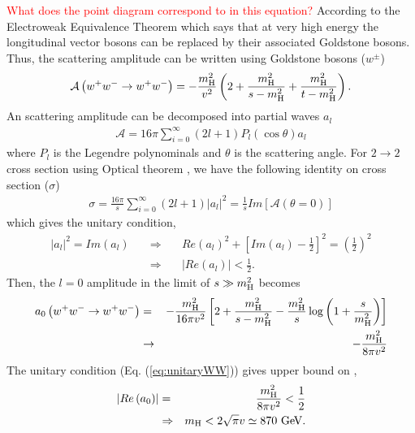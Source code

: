 \textcolor{red}{What does the point diagram correspond to in this equation?}  
According to the Electroweak Equivalence Theorem \cite{31-33} which says 
that at very high energy the longitudinal vector bosons can be replaced by 
their associated Goldstone bosons. Thus, the scattering amplitude can be written 
using Goldstone bosons ($w^\pm$)
\begin{eqnarray} 
\mathcal{A}\left( w^+w^- \to w^+w^- \right) 
= 
- \frac{m_{\mathrm{H}}^2}{v^2}  \left( 2 + \frac{m_{\mathrm{H}}^2}{s - m_{\mathrm{H}}^2} + \frac{m_{\mathrm{H}}^2}{t - m_{\mathrm{H}}^2} \right). 
\end{eqnarray} 
An scattering amplitude can be decomposed into partial waves $a_l$
\begin{eqnarray} 
\mathcal{A} = 16 \pi \sum_{i=0}^\infty 
              \left( 2l+1 \right) P_l \left( \cos \theta \right) a_l
\end{eqnarray} 
where $P_l$ is the Legendre polynominals and $\theta$ is the scattering angle.
For $2 \to 2$ cross section using Optical theorem \cite{optical}, we have the 
following identity on cross section ($\sigma$) 
\begin{eqnarray} 
\sigma 
= \frac{16 \pi}{s} \sum_{i=0}^\infty  \left( 2l+1 \right) \left| a_l \right|^2 
= \frac{1}{s} Im \left[ \mathcal{A} \left(\theta = 0 \right)  \right]
\end{eqnarray} 
which gives the unitary condition, 
\begin{eqnarray} 
\left| a_l \right|^2 = Im \left( a_l \right) 
\quad &\Rightarrow& \quad  
Re\left( a_l \right)^2 
+ \left[ Im\left( a_l \right)  - \frac{1}{2} \right]^2 
= \left( \frac{1}{2} \right)^2 \\
\label{eq:unitaryWW}
\quad &\Rightarrow& \quad 
\left| Re \left( a_l \right) \right| < \frac{1}{2}.   
\end{eqnarray} 
Then, the $l=0$ amplitude in the limit of $ s \gg m_{\mathrm{H}}^2$ becomes  
\begin{eqnarray} 
a_0\left( w^+w^- \to w^+w^- \right)  
&=&  
- \frac{m_{\mathrm{H}}^2}{16\pi v^2}  
\left[ 2 + \frac{m_{\mathrm{H}}^2}{s - m_{\mathrm{H}}^2} 
       - \frac{m_{\mathrm{H}}^2}{s} \log \left( 1 + \frac{s}{m_{\mathrm{H}}^2} \right) \right]  \\
&\rightarrow&
- \frac{m_{\mathrm{H}}^2}{8\pi v^2} 
\end{eqnarray} 
The unitary condition (Eq. (\ref{eq:unitaryWW})) gives upper bound on \mHi, 
\begin{eqnarray} 
\left| Re \left( a_0 \right) \right| 
&=&  \frac{m_{\mathrm{H}}^2}{8\pi v^2} < \frac{1}{2} \\ 
&\Rightarrow& 
m_{\mathrm{H}} < 2 \sqrt{\pi} v \simeq 870~\mathrm{Ge\kern -0.1em V}. 
\end{eqnarray} 

